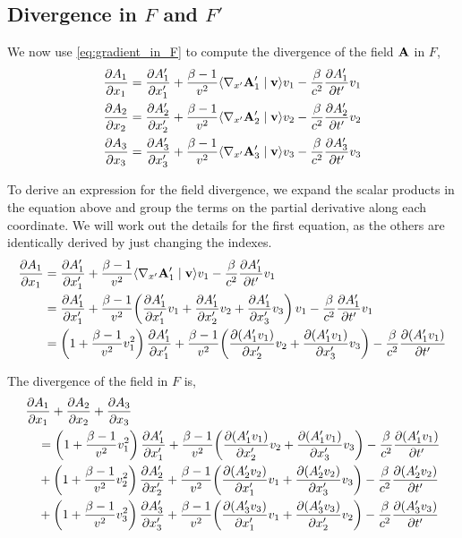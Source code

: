 \documentclass[12pt]{article}
\newcommand{\ip}[2]{\langle #1 \mid #2 \rangle}
\begin{document}
\subsection{Divergence in $F$ and $F'$}

We now use \eqref{eq:gradient_in_F} to compute the divergence of the field $\vb{A}$ in $F$,
\begin{align}
  \pdv{A_1}{x_1} &= \pdv{A'_1}{x'_1}
    + \frac{\beta-1}{v^2}\ip{\nabla_{x'}\vb{A}'_1}{\vb{v}}v_1
    - \frac{\beta}{c^2}\pdv{A'_1}{t'}v_1 \\
  \pdv{A_2}{x_2} &= \pdv{A'_2}{x'_2}
    + \frac{\beta-1}{v^2}\ip{\nabla_{x'}\vb{A}'_2}{\vb{v}}v_2
    - \frac{\beta}{c^2}\pdv{A'_2}{t'}v_2 \\
  \pdv{A_3}{x_3} &= \pdv{A'_3}{x'_3}
    + \frac{\beta-1}{v^2}\ip{\nabla_{x'}\vb{A}'_3}{\vb{v}}v_3
    - \frac{\beta}{c^2}\pdv{A'_3}{t'}v_3
\end{align}

To derive an expression for the field divergence, we expand the scalar products in the
equation above and group the terms on the partial derivative along each coordinate. We will
work out the details for the first equation, as the others are identically derived by just
changing the indexes.
\begin{equation}
  \begin{aligned}
    \pdv{A_1}{x_1} &= \pdv{A'_1}{x'_1}
      + \frac{\beta-1}{v^2}\ip{\nabla_{x'}\vb{A}'_1}{\vb{v}}v_1
      - \frac{\beta}{c^2}\pdv{A'_1}{t'}v_1 \\
    &= \pdv{A'_1}{x'_1}
      + \frac{\beta-1}{v^2}\!\left(
          \pdv{A'_1}{x'_1}v_1 + \pdv{A'_1}{x'_2}v_2 + \pdv{A'_1}{x'_3}v_3
        \right)v_1
      - \frac{\beta}{c^2}\pdv{A'_1}{t'}v_1 \\
    &= \left(1 + \frac{\beta-1}{v^2}v_1^2\right)\pdv{A'_1}{x'_1}
      + \frac{\beta-1}{v^2}\!\left(
          \pdv{(A'_1 v_1)}{x'_2}v_2 + \pdv{(A'_1 v_1)}{x'_3}v_3
        \right)
      - \frac{\beta}{c^2}\pdv{(A'_1 v_1)}{t'}
  \end{aligned}
\end{equation}

The divergence of the field in $F$ is,
\begin{equation}
  \begin{aligned}
    &\pdv{A_1}{x_1} + \pdv{A_2}{x_2} + \pdv{A_3}{x_3} \\
    &\quad= \left(1 + \frac{\beta-1}{v^2}v_1^2\right)\pdv{A'_1}{x'_1}
      + \frac{\beta-1}{v^2}\!\left(\pdv{(A'_1 v_1)}{x'_2}v_2 + \pdv{(A'_1 v_1)}{x'_3}v_3\right)
      - \frac{\beta}{c^2}\pdv{(A'_1 v_1)}{t'} \\
    &\quad+ \left(1 + \frac{\beta-1}{v^2}v_2^2\right)\pdv{A'_2}{x'_2}
      + \frac{\beta-1}{v^2}\!\left(\pdv{(A'_2 v_2)}{x'_1}v_1 + \pdv{(A'_2 v_2)}{x'_3}v_3\right)
      - \frac{\beta}{c^2}\pdv{(A'_2 v_2)}{t'} \\
    &\quad+ \left(1 + \frac{\beta-1}{v^2}v_3^2\right)\pdv{A'_3}{x'_3}
      + \frac{\beta-1}{v^2}\!\left(\pdv{(A'_3 v_3)}{x'_1}v_1 + \pdv{(A'_3 v_3)}{x'_2}v_2\right)
      - \frac{\beta}{c^2}\pdv{(A'_3 v_3)}{t'}
  \end{aligned}
\end{equation}
\end{document}
